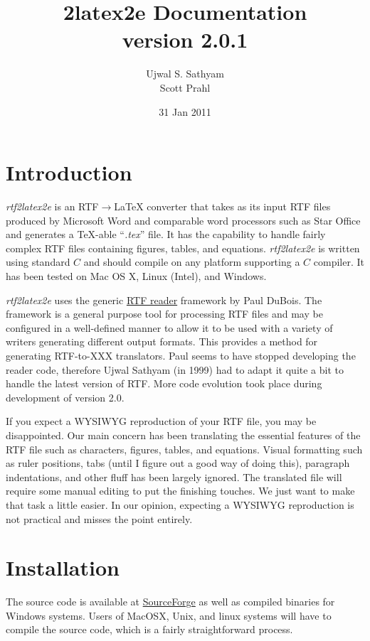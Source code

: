 \documentclass{article}
\title{\rtf2latex2e Documentation\\
version 2.0.1}
\author{Ujwal S. Sathyam\\ Scott Prahl}
\date{31 Jan 2011}
\def\rtf2latex2e{{\it rtf2latex2e}}
\begin{document}
 
\maketitle

\section{Introduction 
\label{intro}} \rtf2latex2e is an RTF$\rightarrow${\LaTeX}
converter that takes as its input RTF files produced by Microsoft Word
and comparable word processors such as Star Office and generates a
\TeX-able ``{\it .tex}'' file.  It has the capability to handle fairly
complex RTF files containing figures, tables, and equations.  
\rtf2latex2e is written using standard $C$ and
should compile on any platform supporting a $C$ compiler.  It has
been tested on Mac OS X, Linux (Intel), and Windows.

\rtf2latex2e uses the generic
\href{http://www.snake.net/software/RTF/}{RTF reader}
framework by Paul DuBois.  The framework is a general purpose tool for
processing RTF files and may be configured in a well-defined manner to
allow it to be used with a variety of writers generating different
output formats.  This provides a method for generating RTF-to-XXX
translators.  Paul seems to have stopped developing the
reader code, therefore Ujwal Sathyam (in 1999) had to adapt it quite a bit to handle the
latest version of RTF.  More code evolution took place during
development of version 2.0.

If you expect a WYSIWYG reproduction of your RTF file, you may be
disappointed.  Our main concern has been translating the essential
features of the RTF file such as characters, figures, tables, and
equations.  Visual formatting
such as ruler positions, tabs (until I figure out a good way of doing
this), paragraph indentations, and other fluff has been largely ignored.  
The translated {\LaTeXe} file will require some manual editing to put the
finishing touches.  We just want to make that task a little easier.  In
our opinion, expecting a WYSIWYG reproduction is not practical and
misses the point entirely.

\section{Installation}
The source code is available at \href{http://sourceforge.net/projects/rtf2latex2e/}{SourceForge}
as well as compiled binaries for Windows systems. 
Users of MacOSX, Unix, and linux systems will have to compile the source code,
which is a fairly straightforward process.
\end{document}
